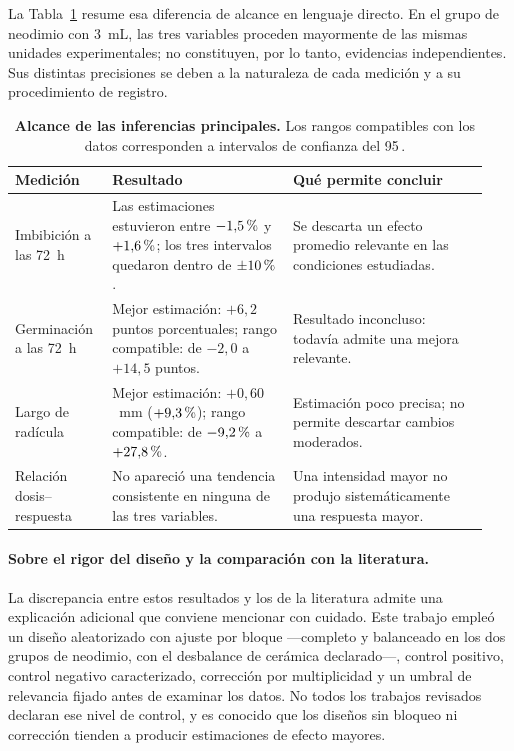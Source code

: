 La Tabla~\ref{tab:sintesis_inferencial} resume esa diferencia de alcance en lenguaje directo. En el grupo de neodimio con 3~mL, las tres variables proceden mayormente de las mismas unidades experimentales; no constituyen, por lo tanto, evidencias independientes. Sus distintas precisiones se deben a la naturaleza de cada medición y a su procedimiento de registro.

\begin{table}[H]
\small
\setlength{\tabcolsep}{4pt}
\centering
\caption[Alcance de las inferencias principales]{\textbf{Alcance de las inferencias principales.} Los rangos compatibles con los datos corresponden a intervalos de confianza del 95\,\pct.}
\label{tab:sintesis_inferencial}
\begin{tabular}{>{\raggedright\arraybackslash}p{0.19\linewidth}
                >{\raggedright\arraybackslash}p{0.36\linewidth}
                >{\raggedright\arraybackslash}p{0.39\linewidth}}
\toprule
Medición & Resultado & Qué permite concluir \\
\midrule
Imbibición a las 72~h
& Las estimaciones estuvieron entre \(-1{,}5\,\text{\%}\) y \(+1{,}6\,\text{\%}\); los tres intervalos quedaron dentro de \(\pm10\,\text{\%}\).
& Se descarta un efecto promedio relevante en las condiciones estudiadas. \\
\addlinespace
Germinación a las 72~h
& Mejor estimación: \(+6{,}2\) puntos porcentuales; rango compatible: de \(-2{,}0\) a \(+14{,}5\) puntos.
& Resultado inconcluso: todavía admite una mejora relevante. \\
\addlinespace
Largo de radícula
& Mejor estimación: \(+0{,}60\)~mm (\(+9{,}3\,\text{\%}\)); rango compatible: de \(-9{,}2\,\text{\%}\) a \(+27{,}8\,\text{\%}\).
& Estimación poco precisa; no permite descartar cambios moderados. \\
\addlinespace
Relación dosis--respuesta
& No apareció una tendencia consistente en ninguna de las tres variables.
& Una intensidad mayor no produjo sistemáticamente una respuesta mayor. \\
\bottomrule
\end{tabular}
\end{table}

\paragraph{Sobre el rigor del diseño y la comparación con la literatura.}

La discrepancia entre estos resultados y los de la literatura admite una explicación adicional que conviene mencionar con cuidado. Este trabajo empleó un diseño aleatorizado con ajuste por bloque ---completo y balanceado en los dos grupos de neodimio, con el desbalance de cerámica declarado---, control positivo, control negativo caracterizado, corrección por multiplicidad y un umbral de relevancia fijado antes de examinar los datos. No todos los trabajos revisados declaran ese nivel de control, y es conocido que los diseños sin bloqueo ni corrección tienden a producir estimaciones de efecto mayores.


